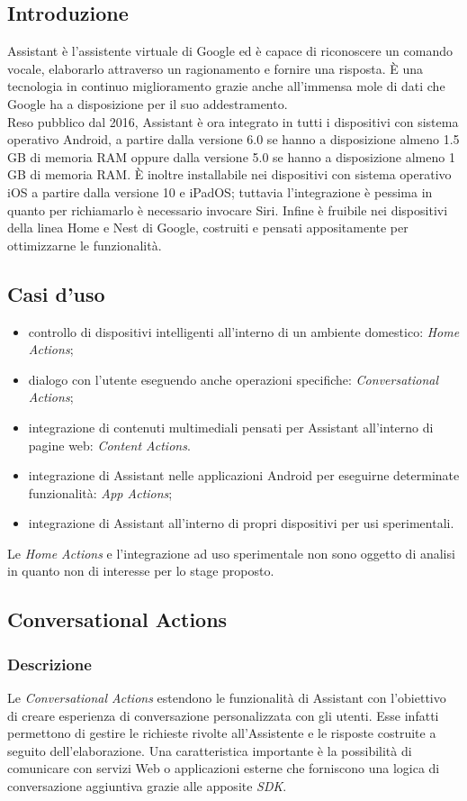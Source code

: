 	\subsection{Introduzione}
	Assistant è l'assistente virtuale di Google ed è capace di riconoscere un comando vocale, elaborarlo attraverso un ragionamento e fornire una risposta. È una tecnologia in continuo miglioramento grazie anche all'immensa mole di dati che Google ha a disposizione per il suo addestramento. \\
	Reso pubblico dal 2016, Assistant è ora integrato in tutti i dispositivi con sistema operativo Android, a partire dalla versione 6.0 se hanno a disposizione almeno 1.5 GB di memoria RAM oppure dalla versione 5.0 se hanno a disposizione almeno 1 GB di memoria RAM. È inoltre installabile nei dispositivi con sistema operativo iOS a partire dalla versione 10 e iPadOS; tuttavia l'integrazione è pessima in quanto per richiamarlo è necessario invocare Siri. Infine è fruibile nei dispositivi della linea Home e Nest di Google, costruiti e pensati appositamente per ottimizzarne le funzionalità.
	\subsection{Casi d'uso}
	\begin{itemize}
		\item controllo di dispositivi intelligenti all'interno di un ambiente domestico: \textit{Home Actions};
		\item dialogo con l'utente eseguendo anche operazioni specifiche: \textit{Conversational Actions};
		\item integrazione di contenuti multimediali pensati per Assistant all'interno di pagine web: \textit{Content Actions}.
		\item integrazione di Assistant nelle applicazioni Android per eseguirne determinate funzionalità: \textit{App Actions};
		\item integrazione di Assistant all'interno di propri dispositivi per usi sperimentali.
	\end{itemize}
	Le \textit{Home Actions} e l'integrazione ad uso sperimentale non sono oggetto di analisi in quanto non di interesse per lo stage proposto.
	\subsection{Conversational Actions}
		\subsubsection{Descrizione}
		Le \textit{Conversational Actions} estendono le funzionalità di Assistant con l'obiettivo di creare esperienza di conversazione personalizzata con gli utenti. Esse infatti permettono di gestire le richieste rivolte all'Assistente e le risposte costruite a seguito dell'elaborazione. Una caratteristica importante è la possibilità di comunicare con servizi Web o applicazioni esterne che forniscono una logica di conversazione aggiuntiva grazie alle apposite \textit{SDK}.
